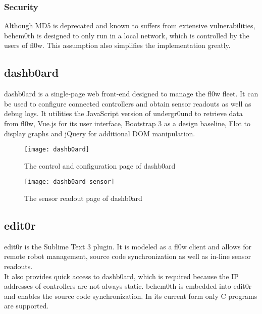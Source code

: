 \documentclass[conference]{IEEEtran}
\begin{document}
\subsubsection{Security}
Although MD5 is deprecated and known to suffers from extensive vulnerabilities, behem0th\cite{behem0th:Christoph Heiss} is designed to only run in a local network, which is controlled by the users of fl0w\cite{fl0w:Philip Trauner}. This assumption also simplifies the implementation greatly.


\subsection{dashb0ard}
dashb0ard\cite{dashb0ard:Sebastian Schaffler} is a single-page web front-end designed to manage the fl0w\cite{fl0w:Philip Trauner} fleet. It can be used to configure connected controllers and obtain sensor readouts as well as debug logs. It utilities the JavaScript version of undergr0und to retrieve data from fl0w\cite{fl0w:Philip Trauner}, Vue.js\cite{Vue:Evan You} for its user interface, Bootstrap 3\cite{Bootstrap 3:Twitter Inc.} as a design baseline, Flot\cite{Flot:David Schnur} to display graphs and jQuery\cite{jQuery:jQuery Foundation} for additional DOM manipulation.

\begin{figure}[H]
\centering
\texttt{[image: dashb0ard]}
\caption{The control and configuration page of dashb0ard\cite{Sublime Text 3:Sublime HQ}}
\label{fig:dashb0ard_config}
\end{figure}

\begin{figure}[H]
\centering
\texttt{[image: dashb0ard-sensor]}
\caption{The sensor readout page of dashb0ard\cite{Sublime Text 3:Sublime HQ}}
\label{fig:dashb0ard_sensor}
\end{figure}
\subsection{edit0r}
edit0r\cite{edit0r:Philip Trauner} is the Sublime Text 3\cite{Sublime Text 3:Sublime HQ} plugin. It is modeled as a fl0w\cite{fl0w:Philip Trauner} client and allows for remote robot management, source code synchronization as well as in-line sensor readouts. \\It also provides quick access to dashb0ard\cite{dashb0ard:Sebastian Schaffler}, which is required because the IP addresses of controllers are not always static. behem0th\cite{behem0th:Christoph Heiss} is embedded into edit0r\cite{edit0r:Philip Trauner} and enables the source code synchronization. In its current form only C programs are supported.\\
\end{document}
